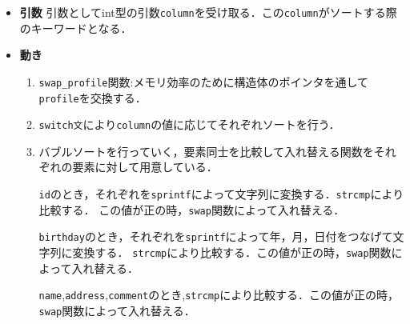   \begin{itemize}
    \item \textbf{引数} 引数としてint型の引数\texttt{column}を受け取る．この\texttt{column}がソートする際のキーワードとなる．
    \item \textbf{動き}
    \begin{enumerate}
      \item \texttt{swap\_profile}関数:メモリ効率のために構造体のポインタを通して\texttt{profile}を交換する．
      \item \texttt{switch文}により\texttt{column}の値に応じてそれぞれソートを行う．
      \item バブルソートを行っていく，要素同士を比較して入れ替える関数をそれぞれの要素に対して用意している．
            
            \texttt{id}のとき，それぞれを\texttt{sprintf}によって文字列に変換する．\texttt{strcmp}により比較する．
            この値が正の時，\texttt{swap}関数によって入れ替える．

            \texttt{birthday}のとき，それぞれを\texttt{sprintf}によって年，月，日付をつなげて文字列に変換する．
            \texttt{strcmp}により比較する．この値が正の時，\texttt{swap}関数によって入れ替える．

            \texttt{name},\texttt{address},\texttt{comment}のとき,\texttt{strcmp}により比較する．この値が正の時，\texttt{swap}関数によって入れ替える．
  
  
    \end{enumerate}
  \end{itemize}
  

